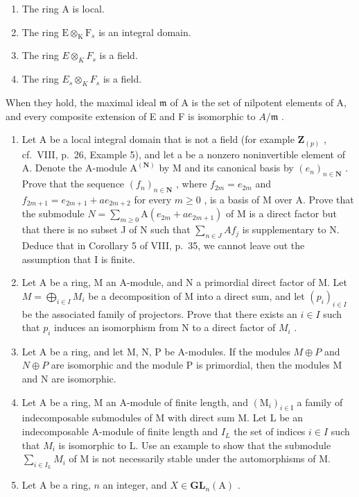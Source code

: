 \begin{enumerate}
\def\labelenumi{(\roman{enumi})}
\item
  The ring A is local.
\item
  The ring \(\mathrm{E}\otimes_{\mathrm{K}}\mathrm{F}_s\) is an integral domain.
\item
  The ring \(E \otimes_{K} F_{s}\) is a field.
\item
  The ring \(E_{s} \otimes_{K} F_{s}\) is a field.
\end{enumerate}

When they hold, the maximal ideal \(\mathfrak{m}\) of A is the set of nilpotent elements of A, and every composite extension of E and F is isomorphic to \(A / \mathfrak{m}\) .

\begin{enumerate}
\def\labelenumi{\arabic{enumi})}
\setcounter{enumi}{12}
\item
  Let A be a local integral domain that is not a field (for example \(\mathbf{Z}_{(p)}\) , cf.~VIII, p.~26, Example 5), and let a be a nonzero noninvertible element of A. Denote the A-module \(\mathrm{A}^{(\mathbf{N})}\) by M and its canonical basis by \((e_{n})_{n\in\mathbf{N}}\) . Prove that the sequence \((f_{n})_{n\in\mathbf{N}}\) , where \(f_{2m}=e_{2m}\) and \(f_{2m+1}=e_{2m+1}+ae_{2m+2}\) for every \(m\geqslant0\) , is a basis of M over A. Prove that the submodule \(N=\sum_{m\geqslant0}\mathrm{A}(e_{2m}+ae_{2m+1})\) of M is a direct factor but that there is no subset J of N such that \(\sum_{n\in J}Af_{j}\) is supplementary to N. Deduce that in Corollary 5 of VIII, p.~35, we cannot leave out the assumption that I is finite.
\item
  Let A be a ring, M an A-module, and N a primordial direct factor of M. Let \(M = \bigoplus_{i \in I} M_i\) be a decomposition of M into a direct sum, and let \((p_i)_{i \in I}\) be the associated family of projectors. Prove that there exists an \(i \in I\) such that \(p_i\) induces an isomorphism from N to a direct factor of \(M_i\) .
\item
  Let A be a ring, and let M, N, P be A-modules. If the modules \(M \oplus P\) and \(N \oplus P\) are isomorphic and the module P is primordial, then the modules M and N are isomorphic.
\item
  Let A be a ring, M an A-module of finite length, and \((\mathrm{M}_{i})_{i\in\mathrm{I}}\) a family of indecomposable submodules of M with direct sum M. Let L be an indecomposable A-module of finite length and \(I_{L}\) the set of indices \(i\in I\) such that \(M_{i}\) is isomorphic to L. Use an example to show that the submodule \(\sum_{i\in I_{L}}M_{i}\) of M is not necessarily stable under the automorphisms of M.
\item
  Let \(\mathrm{A}\) be a ring, \(n\) an integer, and \(X \in \mathbf{GL}_n(\mathrm{A})\) .
\end{enumerate}


